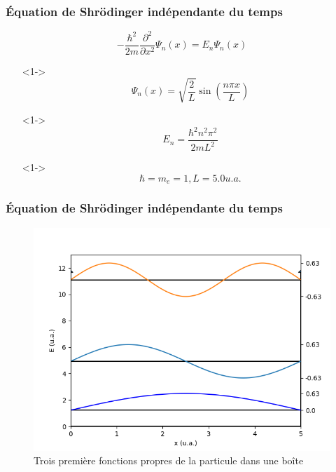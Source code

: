 \documentclass[aspectratio=169]{beamer}
\begin{document}
\begin{frame}
\frametitle{Équation de Shrödinger indépendante du temps}


\begin{equation}\tag{4}
-\frac{\hbar^2}{2m}\frac{\partial^2}{\partial x^2}\Psi_n(x)=E_n\Psi_n(x)
\end{equation} 

\begin{itemize}
\item[]<1-> \begin{equation}\tag{5}
\Psi_n(x)=\sqrt{\frac{2}{L}}\sin(\frac{n\pi x}{L})
\end{equation}  

\item[]<1-> \begin{equation}\tag{8}
E_n=\frac{\hbar^2n^2\pi^2}{2mL^2} 
\end{equation} 
\item[]<1-> \begin{equation}\tag{9}
\hbar=m_e=1 , L=5.0 u.a. 
\end{equation} 

\end{itemize}

\end{frame}


\begin{frame}
\frametitle{Équation de Shrödinger indépendante du temps}
\begin{figure}[h]
\includegraphics[scale=0.5]{fct_propre}
\caption{Trois première fonctions propres de la particule dans une boîte}
\end{figure}
\end{frame}
\end{document}
